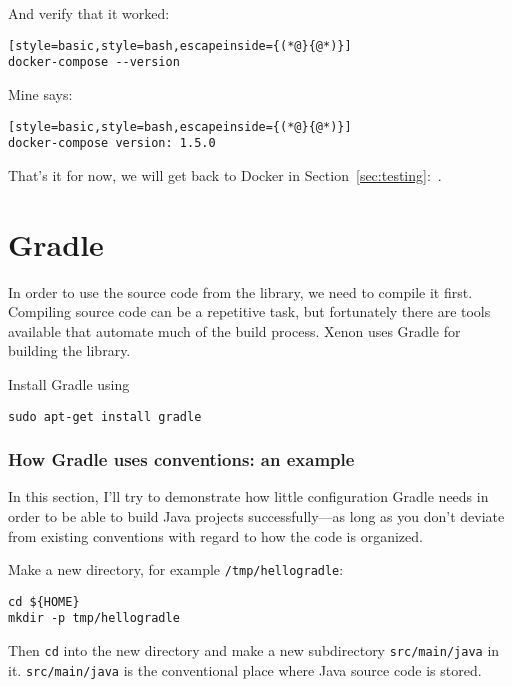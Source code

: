 And verify that it worked:
\begin{lstlisting}[style=basic,style=bash,escapeinside={(*@}{@*)}]
docker-compose --version
\end{lstlisting}
Mine says:
\begin{lstlisting}[style=basic,style=bash,escapeinside={(*@}{@*)}]
docker-compose version: 1.5.0
\end{lstlisting}

That's it for now, we will get back to Docker in Section~\ref{sec:testing}:~.










\section{Gradle}

In order to use the source code from the library, we need to compile it first. Compiling source code can be a repetitive task, but fortunately there are tools available that automate much of the build process. Xenon uses Gradle for building the library.

Install Gradle using
\begin{lstlisting}[style=basic,style=bash]
sudo apt-get install gradle
\end{lstlisting}




\subsubsection{How Gradle uses conventions: an example}

In this section, I'll try to demonstrate how little configuration Gradle needs in order to be able to build Java projects successfully---as long as you don't deviate from existing conventions with regard to how the code is organized.

Make a new directory, for example \texttt{\mytilde{}/tmp/hellogradle}:
\begin{lstlisting}[style=basic,style=bash]
cd ${HOME}
mkdir -p tmp/hellogradle
\end{lstlisting} %


Then \texttt{cd} into the new directory and make a new subdirectory \texttt{src/main/java} in it. \texttt{src/main/java} is the conventional place where Java source code is stored.

